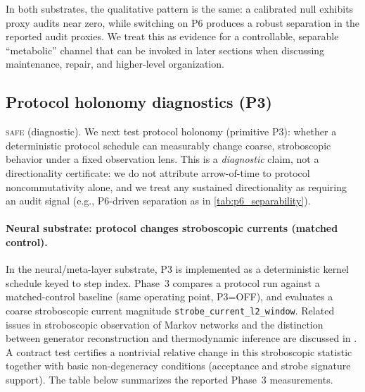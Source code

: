 \documentclass[11pt]{article}
\newcommand{\SAFE}{\textsc{safe}}
\begin{document}
In both substrates, the qualitative pattern is the same: a calibrated null exhibits proxy audits near zero, while switching on P6 produces a robust separation in the reported audit proxies. We treat this as evidence for a controllable, separable ``metabolic'' channel that can be invoked in later sections when discussing maintenance, repair, and higher-level organization.

\subsection{Protocol holonomy diagnostics (P3)}\label{sec:results:p3}
\SAFE{} (diagnostic). We next test protocol holonomy (primitive P3): whether a deterministic protocol schedule can measurably change coarse, stroboscopic behavior under a fixed observation lens. This is a \emph{diagnostic} claim, not a directionality certificate: we do not attribute arrow-of-time to protocol noncommutativity alone, and we treat any sustained directionality as requiring an audit signal (e.g., P6-driven separation as in \cref{tab:p6_separability}).

\paragraph{Neural substrate: protocol changes stroboscopic currents (matched control).}
In the neural/meta-layer substrate, P3 is implemented as a deterministic kernel schedule keyed to step index. Phase~3 compares a protocol run against a matched-control baseline (same operating point, P3=OFF), and evaluates a coarse stroboscopic current magnitude \texttt{strobe\_current\_l2\_window}. Related issues in stroboscopic observation of Markov networks and the distinction between generator reconstruction and thermodynamic inference are discussed in \citet{BauerSeifertVanderMeer2025}. A contract test certifies a nontrivial relative change in this stroboscopic statistic together with basic non-degeneracy conditions (acceptance and strobe signature support). The table below summarizes the reported Phase~3 measurements.
\end{document}
